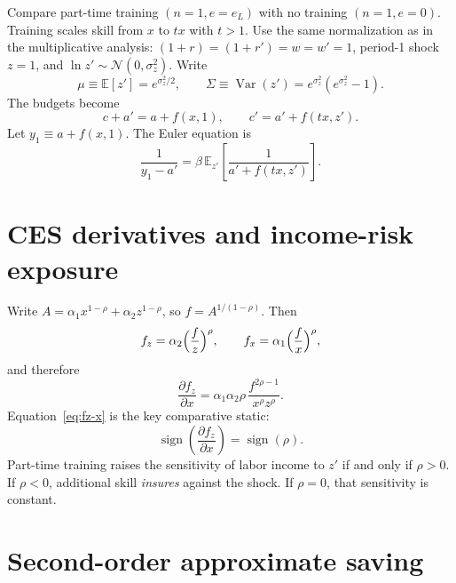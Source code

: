 \documentclass[12pt]{article}
\begin{document}
Compare part-time training $(n=1,e=e_L)$ with no training $(n=1,e=0)$. Training scales skill from $x$ to $tx$ with $t>1$. Use the same normalization as in the multiplicative analysis: $(1+r)=(1+r')=w=w'=1$, period-1 shock $z=1$, and $\ln z'\sim\mathcal{N}(0,\sigma_z^2)$. Write
\begin{equation}
    \mu\equiv\mathbb{E}[z']=e^{\sigma_z^2/2},
    \qquad
    \Sigma\equiv\operatorname{Var}(z')=e^{\sigma_z^2}(e^{\sigma_z^2}-1).
\end{equation}
The budgets become
\begin{equation}
    c+a'=a+f(x,1),
    \qquad
    c'=a'+f(tx,z').
\end{equation}
Let $y_1\equiv a+f(x,1)$. The Euler equation is
\begin{equation}
    \frac{1}{y_1-a'}
    =
    \beta\,\mathbb{E}_{z'}\!\left[\frac{1}{a'+f(tx,z')}\right].
\end{equation}

\section{CES derivatives and income-risk exposure}

Write $A=\alpha_1 x^{1-\rho}+\alpha_2 z^{1-\rho}$, so $f=A^{1/(1-\rho)}$. Then
\begin{equation}
    f_z=\alpha_2\Bigl(\frac{f}{z}\Bigr)^{\rho},
    \qquad
    f_x=\alpha_1\Bigl(\frac{f}{x}\Bigr)^{\rho},
\end{equation}
and therefore
\begin{equation}
    \frac{\partial f_z}{\partial x}
    =
    \alpha_1\alpha_2\rho\,\frac{f^{2\rho-1}}{x^{\rho}z^{\rho}}.
    \label{eq:fz-x}
\end{equation}
Equation~\eqref{eq:fz-x} is the key comparative static:
\begin{equation}
    \operatorname{sign}\!\left(\frac{\partial f_z}{\partial x}\right)
    =
    \operatorname{sign}(\rho).
\end{equation}
Part-time training raises the sensitivity of labor income to $z'$ if and only if $\rho>0$. If $\rho<0$, additional skill \emph{insures} against the shock. If $\rho=0$, that sensitivity is constant.

\section{Second-order approximate saving}
\end{document}

